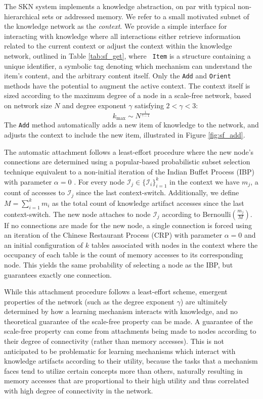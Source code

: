\documentclass[11pt,letterpaper]{article}
\begin{document}
The SKN system implements a knowledge abstraction, on par with typical
non-hierarchical sets or addressed memory. We refer to a small motivated
subnet of the knowledge network as the {\em context}. We provide a simple
interface for interacting with knowledge where all interactions either
retrieve information related to the current context or adjust the context
within the knowledge network, outlined in Table \ref{tab:sf_get}, where {\tt
Item} is a structure containing a unique identifier, a symbolic tag denoting
which mechanism can understand the item's content, and the arbitrary content
itself. Only the {\tt Add} and {\tt Orient} methods have the potential to
augment the active context. The context itself is sized according to the
maximum degree of a node in a scale-free network, based on network size $N$
and degree exponent $\gamma$ satisfying $2<\gamma<3$:
\[k_{\text{max}} \sim N^{\frac1{\gamma-1}}\]
The {\tt Add} method automatically adds a new item of
knowledge to the network, and adjusts the context to include the new item,
illustrated in Figure \ref{fig:sf_add}.

The automatic attachment follows a least-effort procedure where the new
node's connections are determined using a popular-based probabilistic subset
selection technique equivalent to a non-initial iteration of the Indian
Buffet Process (IBP) with parameter $\alpha=0$ \cite{griffiths11}. For every
node $\mathcal{I}_j\in\{\mathcal{I}_i\}_{i=1}^k$ in the context we have
$m_j$, a count of accesses to $\mathcal{I}_j$ since the last context-switch.
Additionally, we define $M=\sum_{i=1}^km_i$ as the total count of knowledge
artifact accesses since the last context-switch. The new node attaches to
node $\mathcal{I}_j$ according to Bernoulli$\left(\frac{m_j}{M}\right)$.
If no connections are made for the new node, a single connection is forced
using an iteration of the Chinese Restaurant Process (CRP) with parameter
$\alpha=0$ and an initial configuration of $k$ tables associated with nodes
in the context where the occupancy of each table is the count of memory
accesses to its corresponding node. This yields the same probability of
selecting a node as the IBP, but guarantees exactly one connection.

While this attachment procedure follows a least-effort scheme, emergent
properties of the network (such as the degree exponent $\gamma$) are
ultimitely determined by how a learning mechanism interacts with knowledge,
and no theoretical guarantee of the scale-free property can be made. A
guarantee of the scale-free property can come from attachments being made to
nodes according to their degree of connectivity (rather than memory
accesses). This is not anticipated to be problematic for learning mechanisms
which interact with knowledge artifacts according to their utility, because
the tasks that a mechanism faces tend to utilize certain concepts more than
others, naturally resulting in memory accesses that are proportional to
their high utility and thus correlated with high degree of connectivity in
the network.
\end{document}

